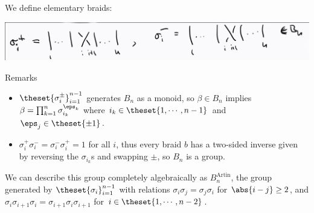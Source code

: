 We define elementary braids:

\includegraphics{figures/image_2020-07-08-11-46-13.png}

Remarks

\begin{itemize}
\item
  \(\theset{\sigma_i^\pm}_{i=1}^{n-1}\) generates \(B_n\) as a monoid,
  so \(\beta \in B_n\) implies
  \(\beta = \prod_{k=1}^n \sigma_{i_k}^{\eps_k}\) where
  \(i_k \in \theset{1, \cdots, n-1}\) and \(\eps_j \in \theset{\pm 1}\).
\item
  \(\sigma_i^+ \sigma_i^- = \sigma_i^- \sigma_i^+ = 1\) for all \(i\),
  thus every braid \(b\) has a two-sided inverse given by reversing the
  \(\sigma_{i_k}\)s and swapping \(\pm\), so \(B_n\) is a group.
\end{itemize}

We can describe this group completely algebraically as
\(B_n^{\text{Artin}}\), the group generated by
\(\theset{\sigma_i}_{i=1}^{n-1}\) with relations
\(\sigma_i \sigma_j = \sigma_j \sigma_i\) for \(\abs{i-j} \geq 2\), and
\(\sigma_i \sigma_{i+1} \sigma_i = \sigma_{i+1} \sigma_i \sigma_{i+1}\)
for \(i\in \theset{1, \cdots, n-2}\).

